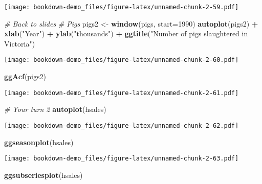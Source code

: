 \documentclass[]{book}
\newenvironment{Shaded}{\begin{snugshade}}{\end{snugshade}}
\newcommand{\CommentTok}[1]{\textcolor[rgb]{0.56,0.35,0.01}{\textit{#1}}}
\newcommand{\DataTypeTok}[1]{\textcolor[rgb]{0.13,0.29,0.53}{#1}}
\newcommand{\DecValTok}[1]{\textcolor[rgb]{0.00,0.00,0.81}{#1}}
\newcommand{\KeywordTok}[1]{\textcolor[rgb]{0.13,0.29,0.53}{\textbf{#1}}}
\newcommand{\NormalTok}[1]{#1}
\newcommand{\OperatorTok}[1]{\textcolor[rgb]{0.81,0.36,0.00}{\textbf{#1}}}
\newcommand{\StringTok}[1]{\textcolor[rgb]{0.31,0.60,0.02}{#1}}
\begin{document}
\texttt{[image: bookdown-demo\_files/figure-latex/unnamed-chunk-2-59.pdf]}

\begin{Shaded}
\begin{Highlighting}[]
\CommentTok{# Back to slides}
\CommentTok{# Pigs}
\NormalTok{  pigs2 <-}\StringTok{ }\KeywordTok{window}\NormalTok{(pigs, }\DataTypeTok{start=}\DecValTok{1990}\NormalTok{)}
  \KeywordTok{autoplot}\NormalTok{(pigs2) }\OperatorTok{+}
\StringTok{    }\KeywordTok{xlab}\NormalTok{(}\StringTok{"Year"}\NormalTok{) }\OperatorTok{+}\StringTok{ }\KeywordTok{ylab}\NormalTok{(}\StringTok{"thousands"}\NormalTok{) }\OperatorTok{+}
\StringTok{    }\KeywordTok{ggtitle}\NormalTok{(}\StringTok{"Number of pigs slaughtered in Victoria"}\NormalTok{)}
\end{Highlighting}
\end{Shaded}

\texttt{[image: bookdown-demo\_files/figure-latex/unnamed-chunk-2-60.pdf]}

\begin{Shaded}
\begin{Highlighting}[]
  \KeywordTok{ggAcf}\NormalTok{(pigs2)}
\end{Highlighting}
\end{Shaded}

\texttt{[image: bookdown-demo\_files/figure-latex/unnamed-chunk-2-61.pdf]}

\begin{Shaded}
\begin{Highlighting}[]
\CommentTok{# Your turn 2}
  \KeywordTok{autoplot}\NormalTok{(hsales)}
\end{Highlighting}
\end{Shaded}

\texttt{[image: bookdown-demo\_files/figure-latex/unnamed-chunk-2-62.pdf]}

\begin{Shaded}
\begin{Highlighting}[]
  \KeywordTok{ggseasonplot}\NormalTok{(hsales)}
\end{Highlighting}
\end{Shaded}

\texttt{[image: bookdown-demo\_files/figure-latex/unnamed-chunk-2-63.pdf]}

\begin{Shaded}
\begin{Highlighting}[]
  \KeywordTok{ggsubseriesplot}\NormalTok{(hsales)}
\end{Highlighting}
\end{Shaded}
\end{document}
